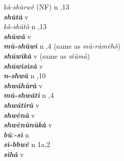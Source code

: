 \begin{multicols}{2}
{\textit{kà-shùrwè} (NF)} \relax  n  ,13  \relax   \relax  \\
{{\bfseries\itshape shùtà}} \relax  v  \relax   \relax  {} \relax   \relax  \\
{\textit{kà-shùtò}} \relax  n  ,13  \relax  \\
{{\bfseries\itshape shûwà}} \relax  v  \relax   \relax  {} \relax   \relax  \\
{{\bfseries\itshape mù-shûwì}} \relax  n  ,4  \relax  \textup{(same as} \textit{mù-rùméhò}\textup{)} \relax  \\
{{\bfseries\itshape shúwìkà}} \relax  v  \relax  {} \relax   \relax  \textup{(same as} \textit{n{ǀ}ûmà}\textup{)}\\
{{\bfseries\itshape shúwìsìsà}} \relax  v  \relax   \relax  {} \relax   \relax  \\
{{\bfseries\itshape n-shwâ}} \relax  n  ,10  \relax   \relax  \\
{{\bfseries\itshape shwáhùrà}} \relax  v  \relax   \relax  {} \relax   \relax  \\
{{\bfseries\itshape mù-shwátì}} \relax  n  ,4  \relax   \relax  \\
{{\bfseries\itshape shwátìrà}} \relax  v  \relax   \relax  {} \relax   \relax  \\
{{\bfseries\itshape shwènà}} \relax  v  \relax   \relax  {} \relax   \relax  \\
{{\bfseries\itshape shwènùnùkà}} \relax  v  \relax   \relax  {} \relax   \relax  \\
{{\bfseries\itshape bûː-sì}} \relax  n   \relax  {} \relax   \relax  \\
{{\bfseries\itshape sì-bbwê}} \relax  n  \relax  1a,2  \relax   \relax  \\
{{\bfseries\itshape sìhà}} \relax  v  \relax   \relax  {} \relax   \relax  \\

\end{multicols}
